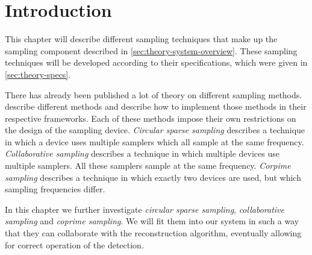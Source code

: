 \documentclass[a4paper, openany, oneside]{memoir}
\begin{document}
\section{Introduction}
This chapter will describe different sampling techniques that make up the sampling component described in \cref{sec:theory-system-overview}. These sampling techniques will be developed according to their specifications, which were given in \cref{sec:theory-specs}.

There has already been published a lot of theory on different sampling methods. \cite{ariananda2012compressive,ariananda2014cooperative,pal2011coprime} describe different methods and describe how to implement those methods in their respective frameworks. Each of these methods impose their own restrictions on the design of the sampling device. \textit{Circular sparse sampling} \cite{ariananda2012compressive} describes a technique in which a device uses multiple samplers which all sample at the same frequency. \textit{Collaborative sampling} \cite{ariananda2014cooperative} describes a technique in which multiple devices use multiple samplers. All these samplers sample at the same frequency. \textit{Corpime sampling} describes a technique in which exactly two devices are used, but which sampling frequencies differ.

In this chapter we further investigate \textit{circular sparse sampling}, \textit{collaborative sampling} and \textit{coprime sampling}. We will fit them into our system in such a way that they can collaborate with the reconstruction algorithm, eventually allowing for correct operation of the detection. 


\end{document}
